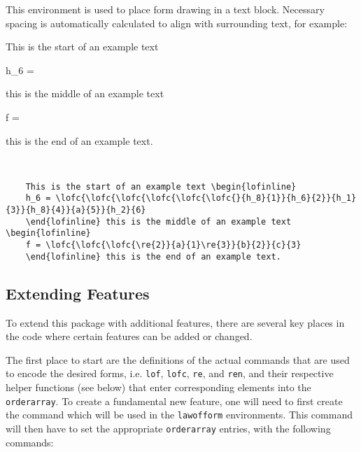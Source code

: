 \documentclass[12pt]{article}
\newcommand{\BS}{\texttt{\symbol{`\\}}}
\newcommand{\Macro}[1]{\texttt{\BS#1}}
\begin{document}
This environment is used to place form drawing in a text block. Necessary spacing is automatically calculated to align with surrounding text, for example:


\begin{minipage}[c]{.45\textwidth}
	This is the start of an example text \begin{lofinline}
		h_6 = 
	\end{lofinline} this is the middle of an example text \begin{lofinline}
		f = 
	\end{lofinline} this is the end of an example text.
\end{minipage}~~
\begin{minipage}[c]{.45\textwidth}
	\begin{lstlisting}
	This is the start of an example text \begin{lofinline}
	h_6 = \lofc{\lofc{\lofc{\lofc{\lofc{\lofc{}{h_8}{1}}{h_6}{2}}{h_1}{3}}{h_8}{4}}{a}{5}}{h_2}{6}
	\end{lofinline} this is the middle of an example text \begin{lofinline}
	f = \lofc{\lofc{\lofc{\re{2}}{a}{1}\re{3}}{b}{2}}{c}{3}
	\end{lofinline} this is the end of an example text.\end{lstlisting}
\end{minipage} 

\subsection{Extending Features}

To extend this package with additional features, there are several key places in the code where certain features can be added or changed.

The first place to start are the definitions of the actual commands that are used to encode the desired forms, i.e. \Macro{lof}, \Macro{lofc}, \Macro{re}, and \Macro{ren}, and their respective helper functions (see below) that enter corresponding elements into the \Macro{orderarray}. To create a fundamental new feature, one will need to first create the command which will be used in the \Macro{lawofform} environments. This command will then have to set the appropriate \Macro{orderarray} entries, with the following commands:
\end{document}
